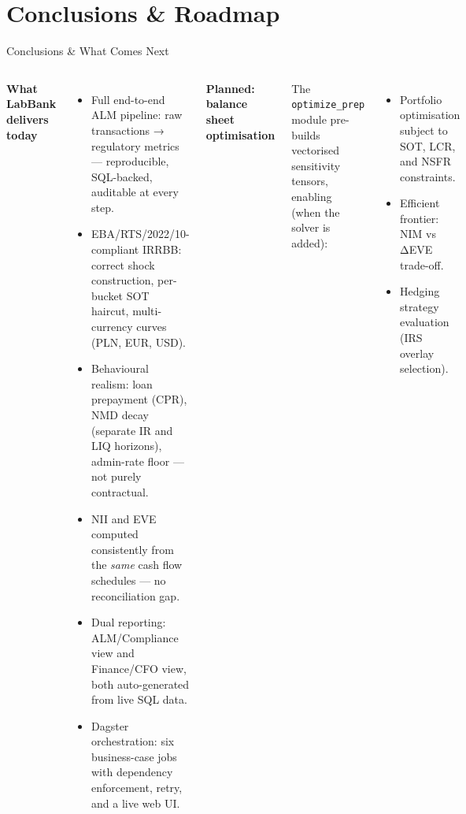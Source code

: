 \documentclass[aspectratio=169,10pt]{beamer}
\begin{document}
\section{Conclusions \& Roadmap}

\begin{frame}{Conclusions \& What Comes Next}

  \begin{columns}[T]
      \textbf{What LabBank delivers today}
      \begin{itemize}
        \item Full end-to-end ALM pipeline: raw transactions →
              regulatory metrics — reproducible, SQL-backed,
              auditable at every step.
        \item EBA/RTS/2022/10-compliant IRRBB: correct shock construction,
              per-bucket SOT haircut, multi-currency curves (PLN, EUR, USD).
        \item Behavioural realism: loan prepayment (CPR),
              NMD decay (separate IR and LIQ horizons),
              admin-rate floor — not purely contractual.
        \item NII and EVE computed consistently from the \textit{same}
              cash flow schedules — no reconciliation gap.
        \item Dual reporting: ALM/Compliance view and Finance/CFO view,
              both auto-generated from live SQL data.
        \item Dagster orchestration: six business-case jobs with
              dependency enforcement, retry, and a live web UI.
      \end{itemize}

      \textbf{Planned: balance sheet optimisation}

      The \texttt{optimize\_prep} module pre-builds vectorised
      sensitivity tensors, enabling (when the solver is added):
      \begin{itemize}
        \item Portfolio optimisation subject to SOT, LCR, and NSFR
              constraints.
        \item Efficient frontier: NIM vs ΔEVE trade-off.
        \item Hedging strategy evaluation (IRS overlay selection).
      \end{itemize}


\end{columns}
\end{frame}
\end{document}
